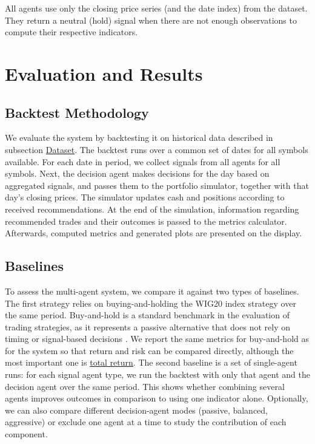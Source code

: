 \documentclass{icis}
\begin{document}
All agents use only the closing price series (and the date index) from the dataset. They return a neutral (hold) signal when there are not enough observations to compute their respective indicators.

\section{Evaluation and Results}

\subsection{Backtest Methodology}

We evaluate the system by backtesting it on historical data described in subsection \hyperref[subsec:dataset]{Dataset}. The backtest runs over a common set of dates for all symbols available. For each date in period, we collect signals from all agents for all symbols. Next, the decision agent makes decisions for the day based on aggregated signals, and passes them to the portfolio simulator, together with that day's closing prices. The simulator updates cash and positions according to received recommendations. At the end of the simulation, information regarding recommended trades and their outcomes is passed to the metrics calculator. Afterwards, computed metrics and generated plots are presented on the display.

\subsection{Baselines}

To assess the multi-agent system, we compare it against two types of baselines. The first strategy relies on buying-and-holding the WIG20 index strategy over the same period. Buy-and-hold is a standard benchmark in the evaluation of trading strategies, as it represents a passive alternative that does not rely on timing or signal-based decisions \autocite{dichtl2020}. We report the same metrics for buy-and-hold as for the system so that return and risk can be compared directly, although the most important one is \hyperref[metric:return]{total return}. The second baseline is a set of single-agent runs: for each signal agent type, we run the backtest with only that agent and the decision agent over the same period. This shows whether combining several agents improves outcomes in comparison to using one indicator alone. Optionally, we can also compare different decision-agent modes (passive, balanced, aggressive) or exclude one agent at a time to study the contribution of each component.
\end{document}
